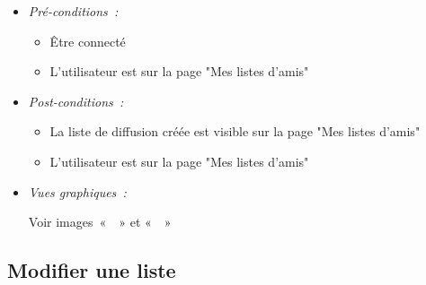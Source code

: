 \begin{itemize}
\item \textit{Pré-conditions~:}

    \begin{itemize}
        \item Être connecté
        \item L'utilisateur est sur la page "Mes listes d'amis"
    \end{itemize}

\item \textit{Post-conditions~:}
    \begin{itemize}
        \item La liste de diffusion créée est visible sur la page "Mes listes d'amis"
        \item L'utilisateur est sur la page "Mes listes d'amis"
\end{itemize}

\item \textit{Vues graphiques~:}

Voir images~«~~» et 
«~~»

\end{itemize}

\subsection{Modifier une liste}\label{subsec:modifier-une-liste}

